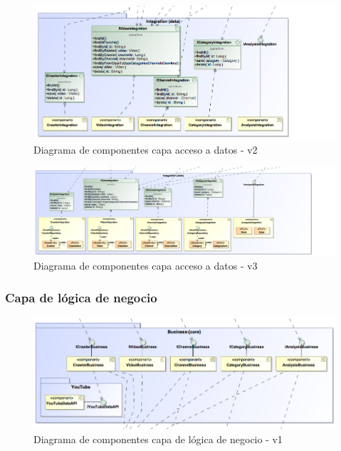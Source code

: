\documentclass[11pt,a4paper]{article}
\begin{document}
\begin{figure}[H]
\centering
\includegraphics[scale=0.3]{diseno/accesoDatos/ComponentDiagram2.png}
\caption{Diagrama de componentes capa acceso a datos - v2}
\end{figure}

\begin{figure}[H]
\centering
\includegraphics[scale=0.25]{diseno/accesoDatos/ComponentDiagram3.png}
\caption{Diagrama de componentes capa acceso a datos - v3}
\end{figure}

\medskip 

\subsubsection{Capa de lógica de negocio}

\begin{figure}[H]
\centering
\includegraphics[scale=0.35]{diseno/negocio/ComponentsDiagram.png}
\caption{Diagrama de componentes capa de lógica de negocio - v1}
\end{figure}
\end{document}
